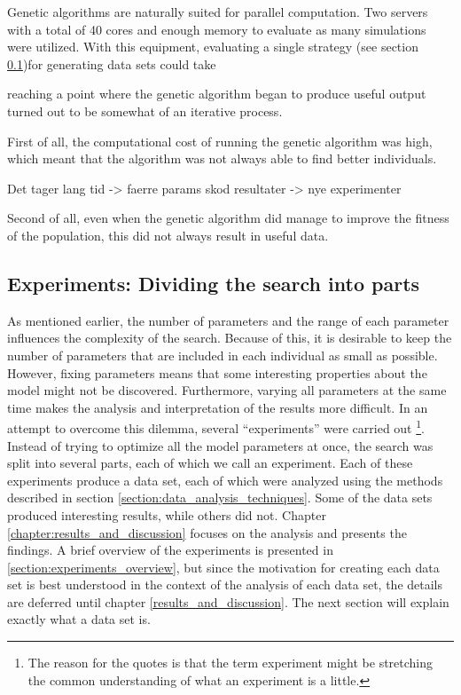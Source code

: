 Genetic algorithms are naturally suited for parallel computation. Two servers with a total of 40 cores and enough memory to evaluate as many simulations were utilized. With this equipment, evaluating a single strategy (see section \ref{section:datasets_introduction})for generating data sets could take 

reaching a point where the genetic algorithm began to produce useful output turned out to be somewhat of an iterative process. 


First of all, the computational cost of running the genetic algorithm was high, which meant that the algorithm was not always able to find better individuals. 

Det tager lang tid -> faerre params
skod resultater -> nye experimenter


Second of all, even when the genetic algorithm did manage to improve the fitness of the population, this did not always result in useful data. 

\subsection{Experiments: Dividing the search into parts}\label{section:datasets_introduction}
As mentioned earlier, the number of parameters and the range of each parameter influences the complexity of the search. Because of this, it is desirable to keep the number of parameters that are included in each individual as small as possible. However, fixing parameters means that some interesting properties about the model might not be discovered. Furthermore, varying all parameters at the same time makes the analysis and interpretation of the results more difficult. In an attempt to overcome this dilemma, several ``experiments'' were carried out \footnote{The reason for the quotes is that the term experiment might be stretching the common understanding of what an experiment is a little.}. Instead of trying to optimize all the model parameters at once, the search was split into several parts, each of which we call an experiment. Each of these experiments produce a data set, each of which were analyzed using the methods described in section \ref{section:data_analysis_techniques}. Some of the data sets produced interesting results, while others did not. Chapter \ref{chapter:results_and_discussion} focuses on the analysis and presents the findings. A brief overview of the experiments is presented in \ref{section:experiments_overview}, but since the motivation for creating each data set is best understood in the context of the analysis of each data set, the details are deferred until chapter \ref{results_and_discussion}. The next section will explain exactly what a data set is.

